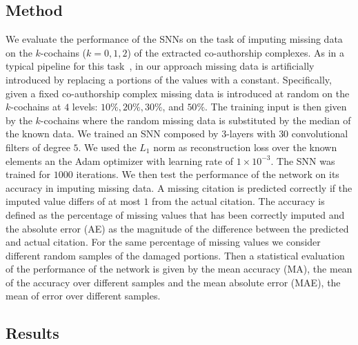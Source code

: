 \subsection{Method}
We evaluate the performance of the SNNs on the task of imputing missing data on the $k$-cochains ($k=0,1,2$) of the extracted co-authorship complexes. As in a typical pipeline for this task~\cite{nelwamondo2007missing}, in our approach missing data is artificially introduced by replacing a portions of the values with a constant. Specifically, given a fixed co-authorship complex missing data is introduced at random on the $k$-cochains at $4$ levels: $10\%,  20\%,  30\%$, and $50\% $. The training input is then given by the $k$-cochains where the random missing data is substituted by the median of the known data. We trained an SNN composed by $3$-layers with $30$ convolutional filters of degree $5$. We used the $L_1$ norm as reconstruction loss over the known elements an the Adam optimizer with learning rate of $1\times 10^{-3}$. The SNN was trained for $1000$ iterations. We then test the performance of the network on its accuracy in imputing missing data. A missing citation is predicted correctly if the imputed value differs of at most $1$ from the actual citation. The accuracy is defined as the percentage of missing values that has been correctly imputed and the absolute error (AE) as the magnitude of the difference between the predicted and actual citation. For the same percentage of missing values we consider different random samples of the damaged portions. Then a statistical evaluation of the performance of the network is given by the mean accuracy (MA), the mean of the accuracy over different samples and the mean absolute error (MAE), the mean of error over different samples.

\subsection{Results}

